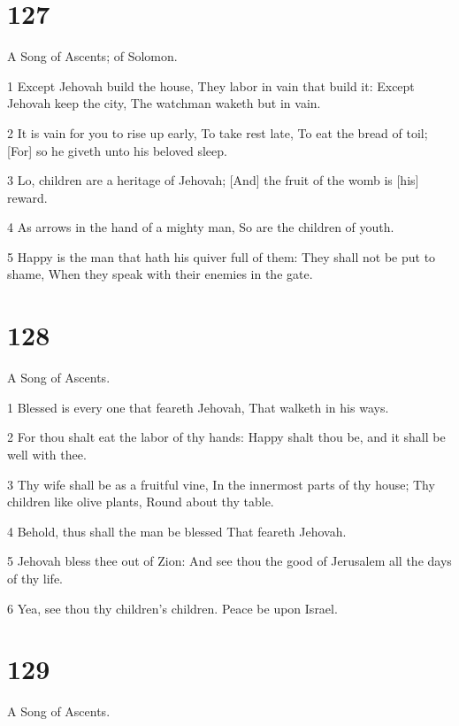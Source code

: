 \chapter{127}

\par A Song of Ascents; of Solomon.

\par 1 Except Jehovah build the house, They labor in vain that build it: Except Jehovah keep the city, The watchman waketh but in vain.
\par 2 It is vain for you to rise up early, To take rest late, To eat the bread of toil; [For] so he giveth unto his beloved sleep.
\par 3 Lo, children are a heritage of Jehovah; [And] the fruit of the womb is [his] reward.
\par 4 As arrows in the hand of a mighty man, So are the children of youth.
\par 5 Happy is the man that hath his quiver full of them: They shall not be put to shame, When they speak with their enemies in the gate.

\chapter{128}

\par A Song of Ascents.

\par 1 Blessed is every one that feareth Jehovah, That walketh in his ways.
\par 2 For thou shalt eat the labor of thy hands: Happy shalt thou be, and it shall be well with thee.
\par 3 Thy wife shall be as a fruitful vine, In the innermost parts of thy house; Thy children like olive plants, Round about thy table.
\par 4 Behold, thus shall the man be blessed That feareth Jehovah.
\par 5 Jehovah bless thee out of Zion: And see thou the good of Jerusalem all the days of thy life.
\par 6 Yea, see thou thy children's children. Peace be upon Israel.

\chapter{129}

\par A Song of Ascents.

